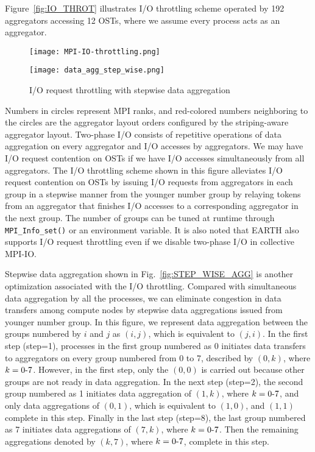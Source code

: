 \documentclass{jhps}
\begin{document}
Figure~\ref{fig:IO_THROT} illustrates
I/O throttling scheme operated by 192 aggregators accessing 12 OSTs,
where we assume every process acts as an aggregator.
%
\begin{figure}[tb]
\centering
\begin{minipage}[b]{0.45\textwidth}
\centering
\texttt{[image: MPI-IO-throttling.png]}
\label{fig:IO_THROT}
\end{minipage}
\noindent
\begin{minipage}[b]{0.45\textwidth}
\centering
\texttt{[image: data\_agg\_step\_wise.png]}
\label{fig:STEP_WISE_AGG}
\end{minipage}
\caption{I/O request throttling with stepwise data aggregation}
\label{fig:IO_THROT_DATA_AGG}
\end{figure}
%
Numbers in circles represent MPI ranks, and red-colored numbers neighboring
to the circles are the aggregator layout orders configured by
the striping-aware aggregator layout.
Two-phase I/O consists of repetitive operations of
data aggregation on every aggregator and I/O accesses by aggregators.
We may have I/O request contention on OSTs
if we have I/O accesses simultaneously from all aggregators.
The I/O throttling scheme shown in this figure alleviates I/O request contention
on OSTs by issuing I/O requests from aggregators in each group in a stepwise manner
from the younger number group by relaying tokens from an aggregator that finishes
I/O accesses to a corresponding aggregator in the next group.
The number of groups can be tuned at runtime through {\tt MPI\_Info\_set()}
or an environment variable.
It is also noted that EARTH also supports I/O request throttling
even if we disable two-phase I/O in collective MPI-IO.

Stepwise data aggregation shown in
Fig.~\ref{fig:STEP_WISE_AGG}
is another optimization associated with the I/O throttling.
Compared with simultaneous data aggregation by all the processes,
we can eliminate congestion in data transfers among compute nodes
by stepwise data aggregations issued from younger number group.
In this figure, we represent data aggregation between
the groups numbered by $i$ and $j$ as $(i,j)$,
which is equivalent to $(j,i)$.
In the first step (step=1), processes in the first group numbered as 0
initiates data transfers to aggregators on every group
numbered from 0 to 7, described by $(0,k)$, where $k=0\mathchar`-7$.
However, in the first step, only the $(0,0)$ is carried out
because other groups are not ready in data aggregation.
In the next step (step=2), the second group numbered as 1 initiates
data aggregation of $(1,k)$, where $k=0\mathchar`-7$,
and only data aggregations of $(0,1)$, which is equivalent to $(1,0)$,
and $(1,1)$ complete in this step.
Finally in the last step (step=8), the last group numbered as 7
initiates data aggregations of $(7,k)$, where $k=0\mathchar`-7$.
Then the remaining aggregations denoted by $(k,7)$,
where $k=0\mathchar`-7$, complete in this step.
\end{document}
